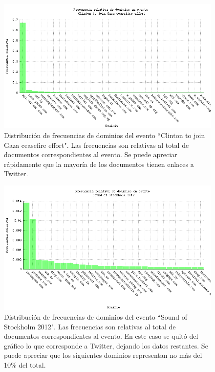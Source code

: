 \begin{figure}[h]
  \centering
  \includegraphics[width=14cm]{./img/clinton-domain-freqs.png}
  \caption[Dominios evento 2]
   {Distribución de frecuencias de dominios del evento ``Clinton to
  join Gaza ceasefire effort"\label{fig:clinton-domains}. Las frecuencias son relativas al total de
  documentos correspondientes al evento. Se puede apreciar rápidamente
  que la mayoría de los documentos tienen enlaces a Twitter.}
\end{figure}

\begin{figure}[h]
  \centering
  \includegraphics[width=14cm]{./img/stockholm-domain-freqs.png}
  \caption[Dominios evento 3]
   {Distribución de frecuencias de dominios del evento ``Sound of
  Stockholm 2012"\label{fig:stockholm-domains}. Las frecuencias son relativas al total de
  documentos correspondientes al evento. En este caso se quitó del
  gráfico lo que corresponde a Twitter, dejando los datos
  restantes. Se puede apreciar que los siguientes dominios representan
  no más del 10\% del total.}
\end{figure}


